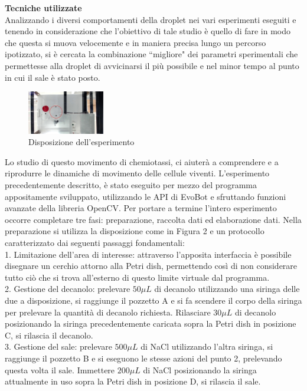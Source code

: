 \textbf{Tecniche utilizzate}
\\Analizzando i diversi comportamenti della droplet nei vari esperimenti eseguiti e tenendo in considerazione che l'obiettivo di tale studio è quello di fare in modo che questa si muova velocemente e in maniera precisa lungo un percorso ipotizzato, si è cercata la combinazione ``migliore" dei parametri sperimentali che permettesse alla droplet di avvicinarsi il più possibile e nel minor tempo al punto in cui il sale è stato posto. 
\begin{figure}
\begin{center}
	  \includegraphics[width=0.3\textwidth]{immagini/exp1.jpg}
\end{center}
	 \caption{Disposizione dell'esperimento}
\end{figure} 
Lo studio di questo movimento di chemiotassi, ci aiuterà a comprendere e a riprodurre le dinamiche di movimento delle cellule viventi. 
L'esperimento precedentemente descritto, è stato eseguito per mezzo del programma appositamente sviluppato, utilizzando le API di EvoBot e sfruttando funzioni avanzate della libreria OpenCV. 
Per portare a termine l'intero esperimento occorre completare tre fasi: preparazione, raccolta dati ed elaborazione dati. 
Nella preparazione si utilizza la disposizione come in Figura 2 e un protocollo caratterizzato dai seguenti passaggi fondamentali:
\\1. Limitazione dell'area di interesse: attraverso l’apposita interfaccia è possibile disegnare un cerchio attorno alla Petri dish, permettendo così di non considerare tutto ciò che si trova all'esterno di questo limite virtuale dal programma.
\\2. Gestione del decanolo: prelevare $50\mu L$ di decanolo utilizzando una siringa delle due a disposizione, si raggiunge il pozzetto A e si fa scendere il corpo della siringa per prelevare la quantità di decanolo richiesta. Rilasciare $30\mu L$ di decanolo posizionando la siringa precedentemente caricata sopra la Petri dish in posizione C, si rilascia il decanolo. 
\\3. Gestione del sale: prelevare $500\mu L$ di NaCl utilizzando l'altra siringa, si raggiunge il pozzetto B e si eseguono le stesse azioni del punto 2, prelevando questa volta il sale. Immettere $200\mu L$ di NaCl posizionando la siringa attualmente in uso sopra la Petri dish in posizione D, si rilascia il sale. 
